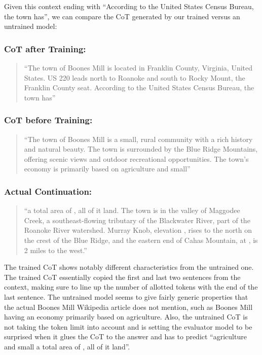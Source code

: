 \documentclass{article} %
\begin{document}
Given this context ending with ``According to the United States Census Bureau, the town has'', we can compare the CoT generated by our trained versus an untrained model:

\subsubsection{CoT after Training:}
\begin{quote}
``The town of Boones Mill is located in Franklin County, Virginia, United States. US 220 leads north to Roanoke and south to Rocky Mount, the Franklin County seat. According to the United States Census Bureau, the town has''
\end{quote}

\subsubsection{CoT before Training:}
\begin{quote}
``The town of Boones Mill is a small, rural community with a rich history and natural beauty. The town is surrounded by the Blue Ridge Mountains, offering scenic views and outdoor recreational opportunities. The town's economy is primarily based on agriculture and small''
\end{quote}

\subsubsection{Actual Continuation:}
\begin{quote}
``a total area of , all of it land. The town is in the valley of Maggodee Creek, a southeast-flowing tributary of the Blackwater River, part of the Roanoke River watershed. Murray Knob, elevation , rises  to the north on the crest of the Blue Ridge, and the eastern end of Cahas Mountain, at , is 2 miles to the west.''
\end{quote}

The trained CoT shows notably different characteristics from the untrained one. The trained CoT essentially copied the first and last two sentences from the context, making sure to line up the number of allotted tokens with the end of the last sentence. The untrained model seems to give fairly generic properties that the actual Boones Mill Wikipedia article does not mention, such as Boones Mill having an economy primarily based on agriculture. Also, the untrained CoT is not taking the token limit into account and is setting the evaluator model to be surprised when it glues the CoT to the answer and has to predict ``agriculture and small a total area of , all of it land''.
\end{document}

